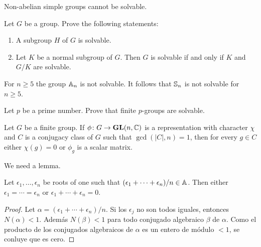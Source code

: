 \begin{example}
	Non-abelian simple groups cannot be solvable. 
\end{example}

\begin{exercise}
	\label{xca:solvable}
	Let $G$ be a group. Prove the following statements:
	\begin{enumerate}
		\item A subgroup $H$ of $G$ is solvable.
		\item Let $K$ be a normal subgroup of $G$. 
		    Then $G$ is solvable if and only if $K$ and $G/K$ are solvable.
	\end{enumerate}
\end{exercise}

\begin{example}
	For $n\geq5$ the group $\mathbb{A}_n$ is not solvable. It follows that 
	$\mathbb{S}_n$ is not solvable for $n\geq5$. 
\end{example}

\begin{exercise}
\label{xca:pgroups_solvable}
	Let $p$ be a prime number. Prove that 
	finite $p$-groups are solvable.
\end{exercise}

\begin{theorem}[Burnside]
	\label{thm:Burnside_auxiliar}
	Let $G$ be a finite group. If $\phi\colon G\to\mathbf{GL}(n,\mathbb{C})$ is a representation
	with character $\chi$ and $C$ is a conjugacy class of $G$ such that 
	$\gcd(|C|,n)=1$, then for every $g\in C$ either 
	$\chi(g)=0$ or $\phi_g$ is a scalar matrix. 
\end{theorem}

We need a lemma.

\begin{lemma}
	\label{lem:4Burnside}
	Let $\epsilon_1,\dots,\epsilon_n$ be roots of one such that 
	$(\epsilon_1+\cdots+\epsilon_n)/n\in\mathbb{A}$. Then either 
	$\epsilon_1=\cdots=\epsilon_n$ or 
	$\epsilon_1+\cdots+\epsilon_n=0$.
\end{lemma}

\begin{proof}
	Let $\alpha=(\epsilon_1+\cdots+\epsilon_n)/n$.
	Si los $\epsilon_j$ no son todos iguales, entonces $N(\alpha)<1$. Además 
	$N(\beta)<1$ para todo conjugado algebraico $\beta$ de $\alpha$. Como el
	producto de los conjugados algebraicos de $\alpha$ es un entero de módulo
	$<1$, se conluye que es cero.
\end{proof}

